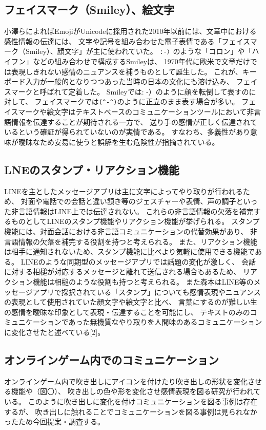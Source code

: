 \documentclass[11pt,a4paper]{ltjsreport}
\begin{document}
\subsection{フェイスマーク（Smiley）、絵文字}
小澤ら\cite{Thesis2}によればEmojiがUnicodeに採用された2010年以前には、文章中における感性情報の伝達には、
文字や記号を組み合わせた電子表情である「フェイスマーク（Smiley）、顔文字」が主に使われていた。
\texttt{:-）}のような「コロン」や「ハイフン」などの組み合わせで構成するSmileyは、
1970年代に欧米で文章だけでは表現しきれない感情のニュアンスを補うものとして誕生した。
これが、キーボード入力が一般的となりつつあった当時の日本の文化にも溶け込み、
フェイスマークと呼ばれて定着した。 Smileyでは: -）のように顔を転倒して表すのに対して、
フェイスマークでは\texttt{(\textasciicircum-\textasciicircum)}のように正立のまま表す場合が多い。
フェイスマークや絵文字はテキストベースのコミュニケーションツールにおいて非言語情報を伝達することが期待される一方で、
送り手の感情が正しく伝達されているという確証が得られていないのが実情である。
すなわち、多義性があり意味が曖昧なため安易に使うと誤解を生む危険性が指摘されている。

\subsection{LNEのスタンプ・リアクション機能}
LINEを主としたメッセージアプリは主に文字によってやり取りが行われるため、
対面や電話での会話と違い頷き等のジェスチャーや表情、声の調子といった非言語情報はLINE上では伝達されない。
これらの非言語情報の欠落を補完するものとしてLINEのスタンプ機能やリアクション機能が挙げられる。
スタンプ機能には、対面会話における非言語コミュニケーションの代替効果があり\cite{Thesis2}、
非言語情報の欠落を補完する役割を持つと考えられる。\cite{Thesis2}
また、リアクション機能は相手に通知されないため、スタンプ機能に比べより気軽に使用できる機能である。
LINEのような同期型のメッセージアプリでは話題の変化が激しく、
会話に対する相槌が対応するメッセージと離れて送信される場合もあるため\cite{Thesis2}、
リアクション機能は相槌のような役割も持つと考えられる。
また森本はLINE等のメッセージアプリで採択されている「スタンプ」についても感情表現やニュアンスの表現として使用されていた顔文字や絵文字と比べ、
言葉にするのが難しい生の感情を曖昧な印象として表現・伝達することを可能にし、
テキストのみのコミュニケーションであった無機質なやり取りを人間味のあるコミュニケーションに変化させたと述べている[2]。

\subsection{オンラインゲーム内でのコミュニケーション}
オンラインゲーム内で吹き出しにアイコンを付けたり吹き出しの形状を変化させる機能や（図〇）、
吹き出しの色や形を変化させ感情表現を図る研究が行われている\cite{Thesis2}。
このように吹き出しに変化を付けコミュニケーションを図る事例は存在するが、
吹き出しに触れることでコミュニケーションを図る事例は見られなかったため今回提案・調査する。
\end{document}
